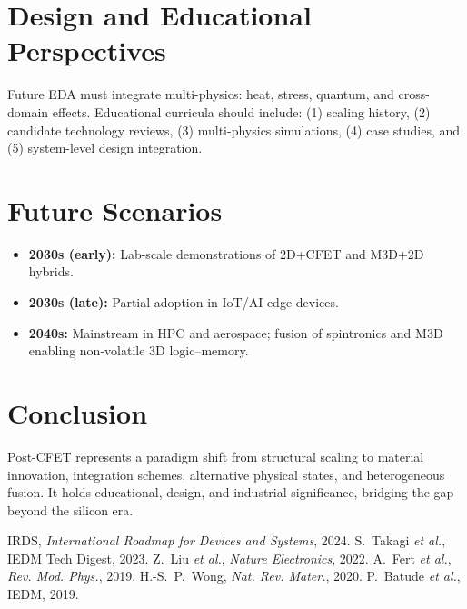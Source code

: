 \documentclass[conference]{IEEEtran}
\begin{document}
\section{Design and Educational Perspectives}
Future EDA must integrate multi-physics: heat, stress, quantum, and cross-domain effects.
Educational curricula should include: (1) scaling history, (2) candidate technology reviews, (3) multi-physics simulations, (4) case studies, and (5) system-level design integration.

\section{Future Scenarios}
\begin{itemize}
  \item \textbf{2030s (early):} Lab-scale demonstrations of 2D+CFET and M3D+2D hybrids.
  \item \textbf{2030s (late):} Partial adoption in IoT/AI edge devices.
  \item \textbf{2040s:} Mainstream in HPC and aerospace; fusion of spintronics and M3D enabling non-volatile 3D logic–memory.
\end{itemize}

\section{Conclusion}
Post-CFET represents a paradigm shift from structural scaling to material innovation, integration schemes, alternative physical states, and heterogeneous fusion. It holds educational, design, and industrial significance, bridging the gap beyond the silicon era.

\begin{thebibliography}{00}
 IRDS, \emph{International Roadmap for Devices and Systems}, 2024.
 S.~Takagi \emph{et al.}, IEDM Tech Digest, 2023.
 Z.~Liu \emph{et al.}, \emph{Nature Electronics}, 2022.
 A.~Fert \emph{et al.}, \emph{Rev. Mod. Phys.}, 2019.
 H.-S.~P.~Wong, \emph{Nat. Rev. Mater.}, 2020.
 P.~Batude \emph{et al.}, IEDM, 2019.
\end{thebibliography}
\end{document}
